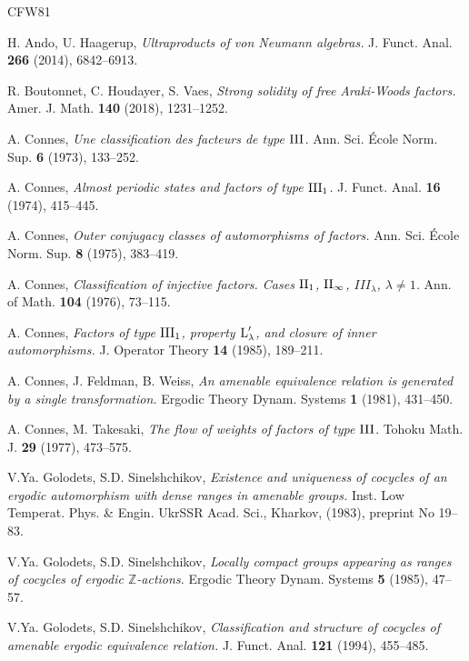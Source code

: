 \documentclass[a4paper,11pt]{amsart}
\numberwithin{equation}{section}
\theoremstyle{definition}
\newcommand{\Z}{\mathbb{Z}}
\newcommand{\rL}{\mathord{\text{\rm L}}}
\newcommand{\II}{{\rm II}}
\newcommand{\III}{{\rm III}}
\begin{document}
\begin{thebibliography}{CFW81}

 {\sc H. Ando, U. Haagerup}, {\it Ultraproducts of von Neumann algebras.} J. Funct. Anal. {\bf 266} (2014), 6842--6913.

 {\sc R. Boutonnet, C. Houdayer, S. Vaes}, {\it Strong solidity of free Araki-Woods factors.} Amer. J. Math. {\bf 140} (2018), 1231--1252.

 {\sc A. Connes}, {\it Une classification des facteurs de type $\III$.} Ann. Sci. \'{E}cole Norm. Sup. {\bf 6} (1973), 133--252.

 {\sc A. Connes}, {\it Almost periodic states and factors of type $\III_1$.} J. Funct. Anal. {\bf 16} (1974), 415--445.

 {\sc A. Connes}, {\it Outer conjugacy classes of automorphisms of factors.} Ann. Sci. \'{E}cole Norm. Sup. {\bf 8} (1975), 383--419.

 {\sc A. Connes}, {\it Classification of injective factors. Cases $\II_1$, $\II_\infty$, $III_\lambda$, $\lambda \neq 1$.} Ann. of Math. {\bf 104} (1976), 73--115.

 {\sc A. Connes}, {\it Factors of type $\III_1$, property $\rL_{\lambda}'$, and closure of inner automorphisms.} J. Operator Theory {\bf 14} (1985), 189--211.

 {\sc A. Connes, J. Feldman, B. Weiss}, {\it An amenable equivalence relation is generated by a single transformation.} Ergodic Theory Dynam. Systems {\bf 1} (1981), 431--450.

 {\sc A. Connes, M. Takesaki}, {\it The flow of weights of factors of type $\III$.} Tohoku Math. J. {\bf 29} (1977), 473--575.

 {\sc V.Ya. Golodets, S.D. Sinelshchikov}, {\it Existence and uniqueness of cocycles of an ergodic automorphism with dense ranges in amenable groups.} Inst. Low Temperat. Phys. \& Engin. UkrSSR Acad. Sci., Kharkov, (1983), preprint No 19--83.

 {\sc V.Ya. Golodets, S.D. Sinelshchikov}, {\it Locally compact groups appearing as ranges of cocycles of ergodic $\Z$-actions.} Ergodic Theory Dynam. Systems {\bf 5} (1985), 47--57.

 {\sc V.Ya. Golodets, S.D. Sinelshchikov}, {\it Classification and structure of cocycles of amenable ergodic equivalence relation.} J. Funct. Anal. {\bf 121} (1994), 455--485.


\end{thebibliography}
\end{document}
